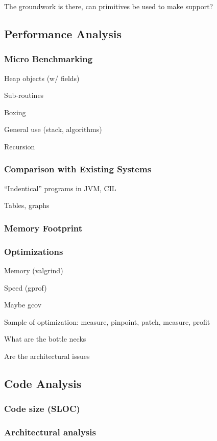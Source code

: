 \documentclass[11pt]{article}
\begin{document}
The groundwork is there, can primitives be used to make support?

\subsection{Performance Analysis}

\subsubsection{Micro Benchmarking}

Heap objects (w/ fields)

Sub-routines

Boxing

General use (stack, algorithms)

Recursion

\subsubsection{Comparison with Existing Systems}

``Indentical'' programs in JVM, CIL

Tables, graphs

\subsubsection{Memory Footprint}

\subsubsection{Optimizations}

Memory (valgrind)

Speed (gprof)

Maybe gcov

Sample of optimization: measure, pinpoint, patch, measure, profit

What are the bottle necks

Are the architectural issues

\subsection{Code Analysis}
\subsubsection{Code size (SLOC)}
\subsubsection{Architectural analysis}
\end{document}

